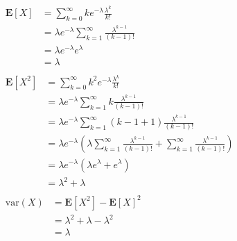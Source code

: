 \begin{example}
    \begin{align}
    &\begin{aligned}
        \mathbf{E}[X] &= \sum_{k=0}^{\infty} k e^{-\lambda} \frac{\lambda^{k}}{k!} \\
                      &= \lambda e^{-\lambda} \sum_{k=1}^{\infty} \frac{\lambda^{k-1}}{(k-1)!} \\
                      &= \lambda e^{-\lambda} e^{\lambda} \\
                      &= \lambda
    \end{aligned} \\
    &\begin{aligned}
        \mathbf{E}[X^{2}] &= \sum_{k=0}^{\infty} k^{2} e^{-\lambda} \frac{\lambda^{k}}{k!} \\
                         &= \lambda e^{-\lambda} \sum_{k=1}^{\infty} k \frac{\lambda^{k-1}}{(k-1)!} \\
                         &= \lambda e^{-\lambda} \sum_{k=1}^{\infty} (k-1+1) \frac{\lambda^{k-1}}{(k-1)!} \\
                         &= \lambda e^{-\lambda} \left(\lambda \sum_{k=1}^{\infty} \frac{\lambda^{k-1}}{(k-1)!} + \sum_{k=1}^{\infty} \frac{\lambda^{k-1}}{(k-1)!}\right) \\
                         &= \lambda e^{-\lambda} (\lambda e^{\lambda} + e^{\lambda}) \\
                         &= \lambda^{2} + \lambda
    \end{aligned} \\
    &\begin{aligned}
        \mathrm{var}(X) &= \mathbf{E}[X^{2}] - \mathbf{E}[X]^{2} \\
                        &= \lambda^{2} + \lambda - \lambda^{2} \\
                        &= \lambda
    \end{aligned}
    \end{align}
\end{example}
